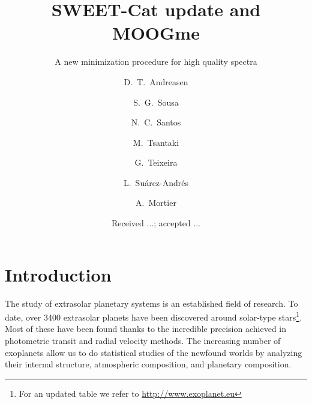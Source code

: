 \documentclass{aa}
\begin{document}
\title{SWEET-Cat update and MOOGme}
\subtitle{A new minimization procedure for high quality spectra}


\author{ D.~T.~Andreasen
    \and S.~G.~Sousa
    \and N.~C.~Santos
    \and M.~Tsantaki
    \and G.~Teixeira
    \and L.~Su\'arez-Andr\'es
    \and A.~Mortier
}







\date{Received ...; accepted ...}

\abstract
{}
{}
{}
{}
{}



\maketitle



\section{Introduction}
\label{sec:introduction}
The study of extrasolar planetary systems is an established field of research.
To date, over 3400 extrasolar planets have been discovered around solar-type
stars\footnote{For an updated table we refer to \url{http://www.exoplanet.eu}}.
Most of these have been found thanks to the incredible precision achieved in
photometric transit and radial velocity methods. The increasing number of
exoplanets allow us to do
statistical studies of the newfound worlds by analyzing their internal
structure, atmospheric composition, and planetary composition.
\end{document}
